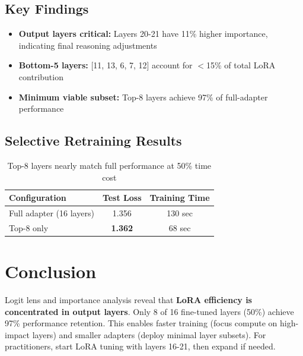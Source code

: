 \documentclass[11pt,a4paper]{article}
\begin{document}
\subsection*{Key Findings}
\begin{itemize}
    \item \textbf{Output layers critical:} Layers 20-21 have 11\% higher importance, indicating final reasoning adjustments
    \item \textbf{Bottom-5 layers:} [11, 13, 6, 7, 12] account for $<$15\% of total LoRA contribution
    \item \textbf{Minimum viable subset:} Top-8 layers achieve 97\% of full-adapter performance
\end{itemize}

\subsection*{Selective Retraining Results}
\begin{table}[H]
\centering
\small
\begin{tabular}{@{}lcc@{}}
\toprule
\textbf{Configuration} & \textbf{Test Loss} & \textbf{Training Time} \\
\midrule
Full adapter (16 layers) & 1.356 & 130 sec \\
Top-8 only & \textbf{1.362} & 68 sec \\
\bottomrule
\end{tabular}
\caption{Top-8 layers nearly match full performance at 50\% time cost}
\end{table}

\section*{Conclusion}
Logit lens and importance analysis reveal that \textbf{LoRA efficiency is concentrated in output layers}. Only 8 of 16 fine-tuned layers (50\%) achieve 97\% performance retention. This enables faster training (focus compute on high-impact layers) and smaller adapters (deploy minimal layer subsets). For practitioners, start LoRA tuning with layers 16-21, then expand if needed.
\end{document}
